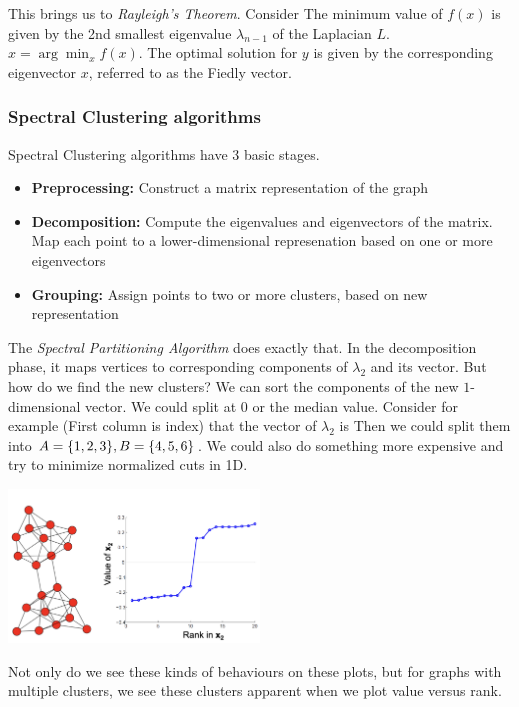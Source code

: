     This brings us to \emph{Rayleigh's Theorem}. Consider 
    The minimum value of $f(x)$ is given by the 2nd smallest eigenvalue $\lambda_{n-1}$ of the Laplacian $L$. $x = \arg \min_x f(x)$. The optimal solution for $y$ is given by the corresponding eigenvector $x$, referred to as the Fiedly vector. 
    
\subsubsection{Spectral Clustering algorithms}
Spectral Clustering algorithms have $3$ basic stages. 
\begin{itemize}
    \item \textbf{Preprocessing:} Construct a matrix representation of the graph
    \item \textbf{Decomposition:} Compute the eigenvalues and eigenvectors of the matrix. Map each point to a lower-dimensional represenation based on one or more eigenvectors
    \item \textbf{Grouping:} Assign points to two or more clusters, based on new representation
\end{itemize}

The \emph{Spectral Partitioning Algorithm} does exactly that. In the decomposition phase, it maps vertices to corresponding components of $\lambda_2$ and its vector. But how do we find the new clusters? We can sort the components of the new $1$-dimensional vector. We could split at $0$ or the median value. Consider for example (First column is index) that the vector of $\lambda_2$ is
Then we could split them into $A = \{1, 2, 3\}, B = \{4, 5, 6\}$. We could also do something more expensive and try to minimize normalized cuts in 1D.

    \begin{center}
        \includegraphics[width=0.5\textwidth]{images/valueverussrank.png}
    \end{center}
Not only do we see these kinds of behaviours on these plots, but for graphs with multiple clusters, we see these clusters apparent when we plot value versus rank.
    
